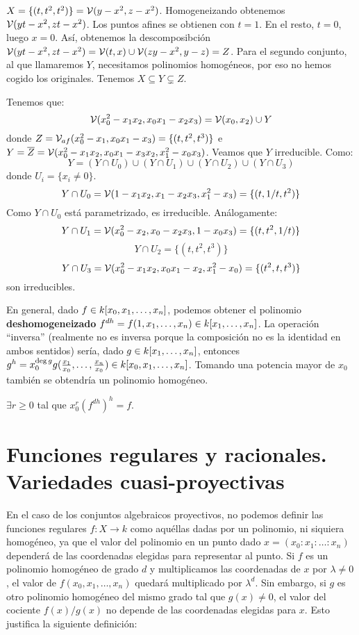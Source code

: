 \documentclass[ACGA.tex]{subfiles}
\begin{document}
\begin{ej}
$X=\{(t,t^2,t^2)\}=\mathcal{V}(y-x^2,z-x^2)$. Homogeneizando obtenemos $\mathcal{V}(yt-x^2,zt-x^2)$. Los puntos afines se obtienen con $t=1$. En el resto, $t=0$, luego $x=0$. Así, obtenemos la descomposibción $\mathcal{V}(yt-x^2,zt-x^2)=\mathcal{V}(t,x)\cup\mathcal{V}(zy-x^2,y-z)=Z$. Para el segundo conjunto, al que llamaremos $Y$, necesitamos polinomios homogéneos, por eso no hemos cogido los originales. Tenemos $X\subseteq Y\subsetneq Z$. 

Tenemos que:
\[ \mathcal{V}(x_0^2-x_1x_2, x_0x_1-x_2x_3) = \mathcal{V}(x_0,x_2) \cup Y \]
donde $Z=\mathcal{V}_{af}(x_0^2-x_1,x_0x_1-x_3) = \{(t,t^2,t^3)\}$ e $Y=\overline{Z}=\mathcal{V}(x_0^2-x_1x_2,x_0x_1-x_3x_2,x_1^2-x_0x_3)$. Veamos que $Y$ irreducible. Como:
\[ Y = (Y \cap U_0) \cup (Y \cap U_1) \cup (Y \cap U_2) \cup (Y \cap U_3) \]
donde $U_i = \{x_i \neq 0\}$.
\[ Y \cap U_0 = \mathcal{V}(1-x_1x_2,x_1-x_2x_3,x_1^2-x_3) = \{(t,1/t,t^2)\} \]
Como $Y \cap U_0$ está parametrizado, es irreducible. Análogamente:
\[ Y \cap U_1 = \mathcal{V}(x_0^2-x_2,x_0-x_2x_3,1-x_0x_3) = \{(t,t^2,1/t)\} \]
\[ Y \cap U_2 = \{(t,t^2,t^3)\} \]
\[ Y \cap U_3 = \mathcal{V}(x_0^2-x_1x_2, x_0x_1-x_2, x_1^2-x_0) = \{(t^2,t,t^3)\} \]
son irreducibles. 
\end{ej}

\begin{nota}
En general, dado $f\in k[x_0,x_1,\dotsc,x_{n}]$, podemos obtener el polinomio \textbf{deshomogeneizado} $f^{dh}=f(1,x_1,\dots,x_n)\in k[x_1,\dotsc,x_{n}]$. La operación ``inversa'' (realmente no es inversa porque la composición no es la identidad en ambos sentidos) sería, dado $g\in k[x_1,\dotsc,x_{n}]$, entonces $g^h=x_0^{\deg{g}}g(\frac{x_1}{x_0},\dots,\frac{x_n}{x_0})\in k[x_0,x_1,\dotsc,x_{n}]$. Tomando una potencia mayor de $x_0$ también se obtendría un polinomio homogéneo. 
\end{nota}

\begin{ejer}
$\exists r\geq 0$ tal que $x_0^r(f^{dh})^h=f$.
\end{ejer}

\section{Funciones regulares y racionales. Variedades cuasi-proyectivas}

En el caso de los conjuntos algebraicos proyectivos, no podemos definir las funciones regulares $f:X\to k$ como aquéllas dadas por un polinomio, ni siquiera homogéneo, ya que el valor del polinomio en un punto dado $x=(x_0:x_1:\ldots:x_n)$ dependerá de las coordenadas elegidas para representar al punto. Si $f$ es un polinomio homogéneo de grado $d$ y multiplicamos las coordenadas de $x$ por $\lambda\neq 0$, el valor de $f(x_0,x_1,\ldots,x_n)$ quedará multiplicado por $\lambda^ d$. Sin embargo, si $g$ es otro polinomio homogéneo del mismo grado tal que $g(x)\neq 0$, el valor del cociente $f(x)/g(x)$ no depende de las coordenadas elegidas para $x$. Esto justifica la siguiente definición:
\end{document}
